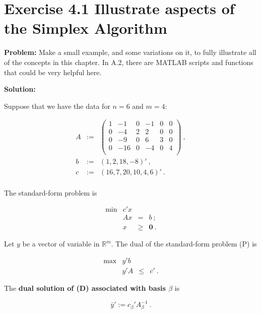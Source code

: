 
\section{Exercise 4.1 Illustrate aspects of the Simplex Algorithm}
\textbf{Problem:} Make a small example, and some variations on it, to fully illustrate all of the concepts in this chapter. In A.2, there are MATLAB scripts and functions that could be very helpful here.

\textbf{Solution:}

Suppose that we have the data for $n=6$ and $m=4$:

\[
\begin{array}{ccl}
A & := & \left(
  \begin{array}{cccccc}
    1 & -1 & 0 & -1 & 0 & 0 \\
    0 & -4 & 2 & 2 & 0 & 0 \\
    0 & -9 & 0 & 6 & 3 & 0 \\
    0 & -16 & 0 & -4 & 0 & 4 \\
  \end{array}
\right)~, \\
b & := & (1,2,18,-8)'~,\\
c & := & (16, 7, 20, 10, 4, 6)'~.\\

\end{array}
\]

The standard-form problem is 

\[
\tag{P}
\begin{array}{rrcl}
 \min & c'x  &      &   \\
      &  Ax  &   =  & b~; \\
      &   x  & \geq & \mathbf{0}~.
\end{array}
\]

Let $y$ be a vector of variable in $\mathbb{R}^m$. The dual of the standard-form problem (P) is

\[
\begin{array}{rrcl}
 \max & y'b  &      &   \\
      &  y'A  &   \leq  & c'~.
\end{array}
\tag{D}
\]

The \textbf{ dual solution of (D) associated with basis $\beta$} is 

$$\bar{y}':= c_\beta'A_\beta^{-1}~.$$


